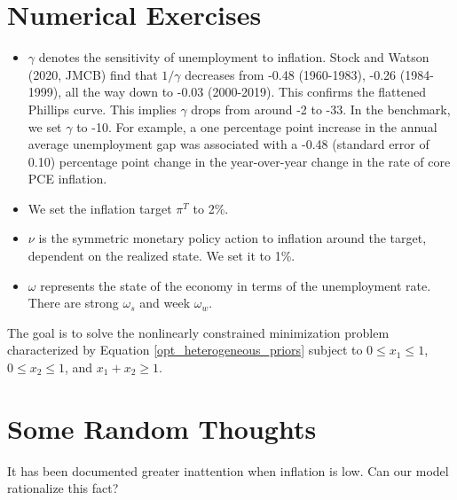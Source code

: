 \documentclass[12pt,a4paper]{article}
\begin{document}
\section{Numerical Exercises}
\begin{itemize}
    \item $\gamma$ denotes the sensitivity of unemployment to inflation. Stock and Watson (2020, JMCB) find that $1/\gamma$ decreases from -0.48 (1960-1983), -0.26 (1984-1999), all the way down to -0.03 (2000-2019). This confirms the flattened Phillips curve. This implies $\gamma$ drops from around -2 to -33. In the benchmark, we set $\gamma$ to -10. For example, a one percentage point increase in the annual average unemployment gap was associated with a -0.48 (standard error of 0.10) percentage point change in the year-over-year change in the rate of core PCE inflation.
    \item We set the inflation target $\pi^T$ to 2\%. 
    \item $\nu$ is the symmetric monetary policy action to inflation around the target, dependent on the realized state. We set it to 1\%.
    \item $\omega$ represents the state of the economy in terms of the unemployment rate. There are strong $\omega_s$ and week $\omega_w$.
\end{itemize}

The goal is to solve the nonlinearly constrained minimization problem characterized by Equation \eqref{opt_heterogeneous_priors} subject to $0 \leq x_1 \leq 1$, $0 \leq x_2 \leq 1$, and $x_1+x_2 \geq 1$.

\section{Some Random Thoughts}

It has been documented greater inattention when inflation is low. Can our model rationalize this fact?

\newpage


\end{document}
